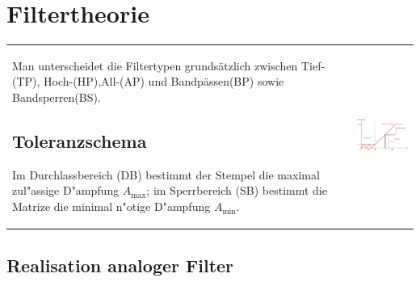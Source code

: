 \section{Filtertheorie }
\begin{tabular}{ll}
\parbox{12cm}{
	Man unterscheidet die Filtertypen grundsätzlich zwischen
	Tief-(TP), Hoch-(HP),All-(AP) und Bandpässen(BP) sowie Bandsperren(BS).
	
	\subsection{Toleranzschema }
	Im Durchlassbereich (DB) bestimmt der Stempel die maximal zul"assige D"ampfung
	$A_{\max}$; im Sperrbereich (SB) bestimmt die Matrize die minimal n"otige
	D"ampfung $A_{\min}$.}
	
& \parbox{6cm}{
	\includegraphics[width=6cm]{./images/filter-toleranzschema.png}}
\end{tabular}

\subsection{Realisation analoger Filter}
